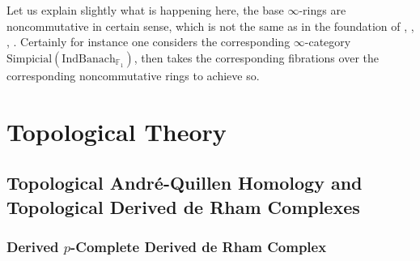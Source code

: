 \documentclass[11pt]{book}
\theoremstyle{definition}
\numberwithin{equation}{section}
\begin{document}
Let us explain slightly what is happening here, the base $\infty$-rings are noncommutative in certain sense, which is not the same as in the foundation of \cite{12BBK}, \cite{BBM}, \cite{KKM}, \cite{12BK}. Certainly for instance one considers the corresponding $\infty$-category $\mathrm{Simpicial}(\mathrm{Ind}\mathrm{Banach}_{\mathbb{F}_1})$, then takes the corresponding fibrations over the corresponding noncommutative rings to achieve so. 






\newpage

\chapter{Topological Theory}

\section{Topological Andr\'e-Quillen Homology and Topological Derived de Rham Complexes}


\subsection{Derived $p$-Complete Derived de Rham Complex}
\end{document}
